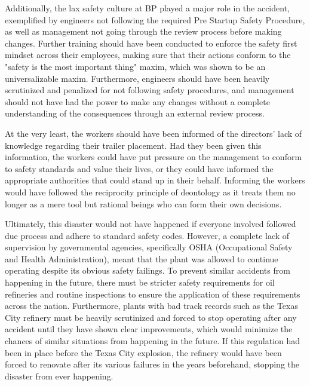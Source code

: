 \documentclass[12pt]{article}
\begin{document}
	Additionally, the lax safety culture at BP played a major role in the accident, exemplified by engineers not following the required Pre Startup Safety Procedure, as well as management not going through the review process before making changes. Further training should have been conducted to enforce the safety first mindset across their employees, making sure that their actions conform to the "safety is the most important thing" maxim, which was shown to be an universalizable maxim. Furthermore, engineers should have been heavily scrutinized and penalized for not following safety procedures, and management should not have had the power to make any changes without a complete understanding of the consequences through an external review process. 
	
	At the very least, the workers should have been informed of the directors' lack of knowledge regarding their trailer placement. Had they been given this information, the workers could have put pressure on the management to conform to safety standards and value their lives, or they could have informed the appropriate authorities that could stand up in their behalf. Informing the workers would have followed the reciprocity principle of deontology as it treats them no longer as a mere tool but rational beings who can form their own decisions. 
	
	Ultimately, this disaster would not have happened if everyone involved followed due process and adhere to standard safety codes. However, a complete lack of supervision by governmental agencies, specifically OSHA (Occupational Safety and Health Administration), meant that the plant was allowed to continue operating despite its obvious safety failings. To prevent similar accidents from happening in the future, there must be stricter safety requirements for oil refineries and routine inspections to ensure the application of these requirements across the nation. Furthermore, plants with bad track records such as the Texas City refinery must be heavily scrutinized and forced to stop operating after any accident until they have shown clear improvements, which would minimize the chances of similar situations from happening in the future. If this regulation had been in place before the Texas City explosion, the refinery would have been forced to renovate after its various failures in the years beforehand, stopping the disaster from ever happening.
	
\end{document}
